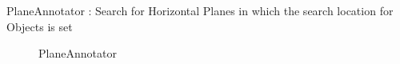 \documentclass[main.tex]{subfiles}
\begin{document}
\begin{itemize}
	\begin{minipage}[t]{\textwidth}
	\item PlaneAnnotator : Search for Horizontal Planes in which the search location for Objects is set
		\begin{figure}[H]
   			 \centering
   			 \caption{PlaneAnnotator}
  		\end{figure}
	\end{minipage}
	

\end{itemize}
\end{document}
